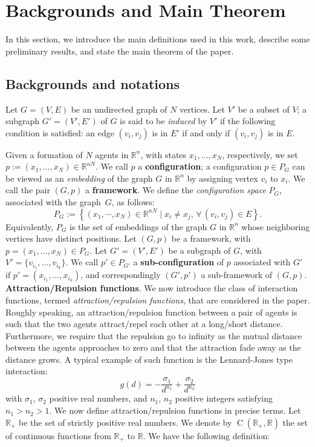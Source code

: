 \documentclass[10pt,twocolumn,twoside]{IEEEtran}
\newcommand{\R}{\mathbb{R}}
\renewcommand{\(}{\left (}
\renewcommand{\)}{\right )}
\renewcommand{\;}{\,;\,}
\begin{document}
\section{Backgrounds and Main Theorem}
In this section, we introduce the main definitions used in this work, describe some preliminary results, and state the main theorem of the paper. 

\subsection{Backgrounds and notations}
Let $G = (V,E)$ be an undirected graph of $N$ vertices. Let $V'$ be a subset of $V$; a subgraph $G' = (V', E')$ of $G$ is said to be {\it induced} by $V'$ if the following condition is satisfied: an edge $(v_i,v_j)$ is in $E'$ if and only if $(v_i,v_j)$ is in $E$.  

Given a formation of $N$ agents in $\R^n$, with states $x_1,\ldots, x_N$,  respectively, we set $p := (x_1,\ldots,x_N) \in \R^{nN}$. We call $p$ a {\bf configuration};  
a configuration $p \in P_G$ can be viewed as an {\it embedding} of the graph $G$ in $\R^n$ by assigning vertex $v_i$ to $x_i$. We call the pair $(G, p)$ a {\bf framework}. 
We define the  {\it configuration space}  $P_{G}$, associated with the graph~$G$, as follows:
\begin{equation*}
P_{G}:=\left\{( x_1,\cdots, x_N)\in \mathbb{R}^{nN} \mid  x_i\neq  x_j, \, \forall \, (v_i,v_j)\in E \right\}. 
\end{equation*} 
Equivalently, $P_{G}$ is the set of embeddings of the graph $G$ in $\mathbb{R}^n$ whose neighboring vertices have distinct positions. 
Let $(G, p)$ be a framework, with $p = (x_1,\ldots, x_N) \in P_G$.  
 Let $G' = \(V',E' \)$ be a subgraph of $G$, with $V' = \{v_{i_1},\ldots,v_{i_k}\}$. We call $p'\in P_{G'}$ a {\bf sub-configuration} of $p$ associated with $G'$ if $p' = (x_{i_1},\ldots, x_{i_k})$, and correspondingly $(G',p')$ a sub-framework of $(G,p)$.   
\vspace{3pt}
\\ 
{\bf Attraction/Repulsion functions}. We  now introduce the class of interaction functions, termed {\it attraction/repulsion functions},  that are considered in the paper. Roughly speaking, an attraction/repulsion function between a pair of agents is such that the two agents attract/repel each other at a long/short distance. Furthermore, we require that the repulsion go to infinity as the mutual distance between the agents approaches to zero and that the attraction fade away as the distance grows.  
A typical example of such function is the Lennard-Jones type interaction:
\begin{equation}\label{eq:typicalexample}
g(d) = -\frac{\sigma_1}{d^{n_1}} + \frac{\sigma_2}{d^{n_2}} 
\end{equation}
with $\sigma_1$, $\sigma_2$ positive real numbers, and $n_1$, $n_2$ positive integers satisfying $n_1 > n_2 > 1$. We now define attraction/repulsion functions in precise terms. Let $\R_+$ be the set of strictly positive real numbers. We denote by $\operatorname{C}(\R_+,\R)$ the set of continuous functions from $\R_+$ to $\R$. We have the following definition:
\end{document}
